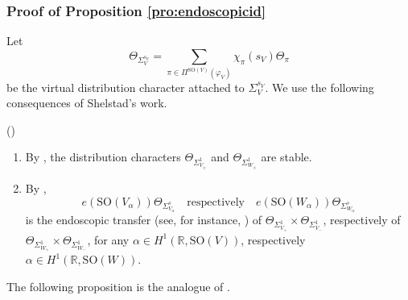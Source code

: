 \documentclass[12pt]{amsart}
\numberwithin{equation}{subsection}
\newcounter{keepeqno}
\newenvironment{num}
 {\setcounter{keepeqno}{\value{equation}}%
  \begin{list}{(\theequation)}{\usecounter{equation}}%
  \setcounter{equation}{\value{keepeqno}}}
 {\end{list}}
\newcommand{\BR}{{\mathbb {R}}}
\newcommand{\SO}{{\mathrm{SO}}}
\def\alp{{\alpha}}
\def\Sig{{\Sigma}}
\def\vphi{\varphi}
\def\SO{\mathrm{SO}}
\begin{document}
\subsubsection{Proof of Proposition \ref{pro:endoscopicid}}

Let
\[
\Theta_{\Sig^{s_V}_V}
=
\sum_{\pi\in \Pi^{\SO(V)}(\vphi_V)}\chi_\pi(s_V)\Theta_\pi
\]
be the virtual distribution character attached to $\Sig^{s_V}_V$. We use the
following consequences of Shelstad's work.
\begin{num}
\item\label{num:shelstadworkendoscopy}
\begin{enumerate}
    \item
By \cite[Lem.~5.2]{shelsteadinner}, the distribution characters $\Theta_{\Sig^{1}_{V_{\pm}}}$ and $\Theta_{\Sig^{1}_{W_\pm}}$ are stable.

\item By \cite{MR532374,shelsteadinner,MR627641,MR2454336,MR2581952,MR2448289},
\[
e(\SO(V_\alp)) \Theta_{\Sig^{s}_{V_\alp}}
\quad \text{respectively}\quad
e(\SO(W_\alp))\Theta_{\Sig^s_{W_\alp}}
\]
is the endoscopic transfer (see, for instance, \cite[\S 1.6]{MR3155345}) of
$\Theta_{\Sig^1_{V_+}}\times \Theta_{\Sig^1_{V_-}}$, respectively of
$\Theta_{\Sig^1_{W_+}}\times \Theta_{\Sig^1_{W_-}}$, for any
$\alp\in H^1(\BR,\SO(V))$, respectively
$\alp\in H^1(\BR,\SO(W))$.
\end{enumerate}
\end{num}

The following proposition is the analogue of \cite[Prop.~3.3]{MR3155345}.
\end{document}
